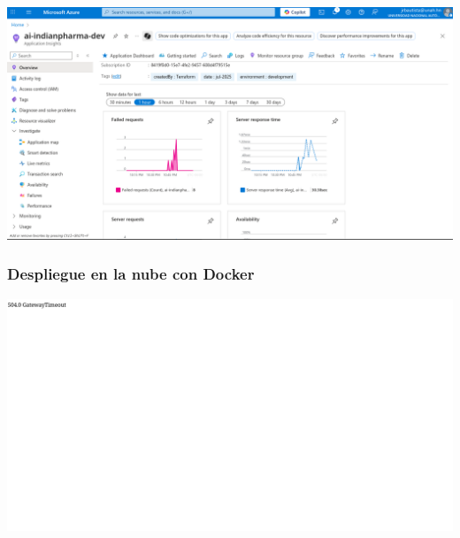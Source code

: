 \documentclass{beamer}
\begin{document}
\begin{frame}
	\includegraphics[width=\textwidth]{03.png}
\end{frame}

\begin{frame}
	\frametitle{Despliegue en la nube con Docker}
	\includegraphics[width=\textwidth]{04.png}
\end{frame}
\end{document}
